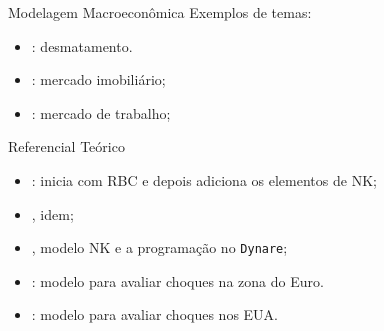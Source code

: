 \documentclass[10pt]{beamer}
\let\olditem\item
\renewcommand{\item}{%
	\olditem\vspace{5pt}}
\begin{document}

\begin{frame}[fragile]{Modelagem Macroeconômica}
Exemplos de temas:	
	\begin{itemize}
		\item \textcite{pereira_desmatamento_2013}: desmatamento.
		
		\item \textcite{albuquerquemello_mercado_2018}: mercado imobiliário;

		\item \textcite{ribeiro_alongamento_2023}: mercado de trabalho;

	\end{itemize}
	
\end{frame}


\begin{frame}[fragile]{Referencial Teórico}
	
	\begin{itemize}
		\item \textcite{costa_junior_understanding_2016}: inicia com RBC e depois adiciona os elementos de NK;
		\item \textcite{gali_monetary_2015}, idem;
		\item \textcite{bergholt_basic_2012}, modelo NK e a programação no \texttt{Dynare};
		\item \textcite{smets_estimated_2003}: modelo para avaliar choques na zona do Euro.
		\item \textcite{smets_shocks_2007}: modelo para avaliar choques nos EUA.
	\end{itemize}
	
\end{frame}

\end{document}
